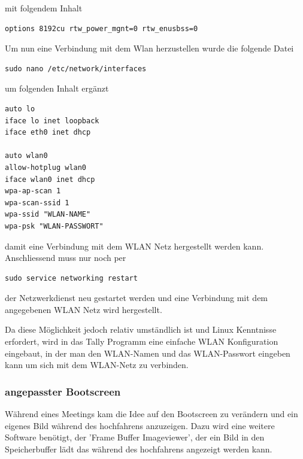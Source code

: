 \documentclass[11pt,a4paper]{article} %
\begin{document}
mit folgendem Inhalt
\begin{frame}

\begin{lstlisting}
options 8192cu rtw_power_mgnt=0 rtw_enusbss=0
\end{lstlisting}

\end{frame}
\par
\par
Um nun eine Verbindung mit dem Wlan herzustellen wurde die folgende Datei
\begin{frame}

\begin{lstlisting}
sudo nano /etc/network/interfaces
\end{lstlisting}

\end{frame}

um folgenden Inhalt ergänzt
\begin{frame}

\begin{lstlisting}
auto lo
iface lo inet loopback
iface eth0 inet dhcp

auto wlan0
allow-hotplug wlan0
iface wlan0 inet dhcp
wpa-ap-scan 1
wpa-scan-ssid 1
wpa-ssid "WLAN-NAME"
wpa-psk "WLAN-PASSWORT"

\end{lstlisting}

\end{frame}

damit eine Verbindung mit dem WLAN Netz hergestellt werden kann.
Anschliessend muss nur noch per
\begin{frame}

\begin{lstlisting}
sudo service networking restart
\end{lstlisting}

\end{frame}
der Netzwerkdienst neu gestartet werden und eine Verbindung mit dem angegebenen WLAN Netz wird hergestellt.
\par
Da diese Möglichkeit jedoch relativ umständlich ist und Linux Kenntnisse erfordert, wird in das Tally Programm eine einfache WLAN Konfiguration eingebaut, in der man den WLAN-Namen und das WLAN-Passwort eingeben kann um sich mit dem WLAN-Netz zu verbinden.

\subsubsection{angepasster Bootscreen}
Während eines Meetings kam die Idee auf den Bootscreen zu verändern und ein eigenes Bild während des hochfahrens anzuzeigen. Dazu wird eine weitere Software benötigt, der 'Frame Buffer Imageviewer', der ein Bild in den Speicherbuffer lädt das während des hochfahrens angezeigt werden kann. \cite{9}
\end{document}
